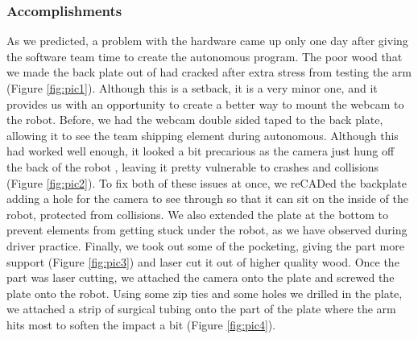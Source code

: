 \subsubsection*{Accomplishments}

As we predicted, a problem with the hardware came up only one day after giving the software team time to create the autonomous program. The poor wood that we made the back plate out of had cracked after extra stress from testing the arm (Figure \ref{fig:pic1}). Although this is a setback, it is a very minor one, and it provides us with an opportunity to create a better way to mount the webcam to the robot. Before, we had the webcam double sided taped to the back plate, allowing it to see the team shipping element during autonomous. Although this had worked well enough, it looked a bit precarious as the camera just hung off the back of the robot , leaving it pretty vulnerable to crashes and collisions (Figure \ref{fig:pic2}). To fix both of these issues at once, we reCADed the backplate adding a hole for the camera to see through so that it can sit on the inside of the robot, protected from collisions. We also extended the plate at the bottom to prevent elements from getting stuck under the robot, as we have observed during driver practice. Finally, we took out some of the pocketing, giving the part more support (Figure \ref{fig:pic3}) and laser cut it out of higher quality wood.
Once the part was laser cutting, we attached the camera onto the plate and screwed the plate onto the robot. Using some zip ties and some holes we drilled in the plate, we attached a strip of surgical tubing onto the part of the plate where the arm hits most to soften the impact a bit (Figure \ref{fig:pic4}).

